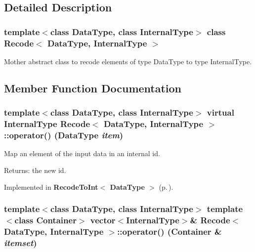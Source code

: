\subsection{Detailed Description}
\subsubsection*{template$<$class Data\-Type, class Internal\-Type$>$ class Recode$<$ Data\-Type, Internal\-Type $>$}

Mother abstract class to recode elements of type Data\-Type to type Internal\-Type. 



\subsection{Member Function Documentation}
\subsubsection{\setlength{\rightskip}{0pt plus 5cm}template$<$class Data\-Type, class Internal\-Type$>$ virtual Internal\-Type {\bf Recode}$<$ Data\-Type, Internal\-Type $>$::operator() (Data\-Type {\em item})\hspace{0.3cm}{\tt  [pure virtual]}}\label{class_recode_266e8a09b4576e02aab3cd6590a9ffbf}


Map an element of the input data in an internal id. 

\begin{Desc}
\item[Returns:]the new id. \end{Desc}


Implemented in {\bf Recode\-To\-Int$<$ Data\-Type $>$} {\rm (p.\,\pageref{class_recode_to_int_84e738bd2a7faf92a7d916e995689cab})}.
\subsubsection{\setlength{\rightskip}{0pt plus 5cm}template$<$class Data\-Type, class Internal\-Type$>$ template$<$class Container$>$ vector$<$Internal\-Type$>$\& {\bf Recode}$<$ Data\-Type, Internal\-Type $>$::operator() (Container \& {\em itemset})\hspace{0.3cm}{\tt  [inline]}}\label{class_recode_d4fc62868c9f2097c762a6e0c66ae685}


